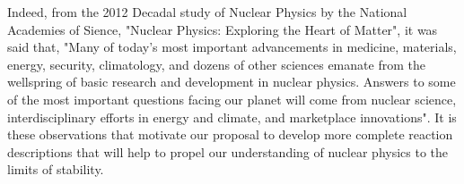 \documentclass[12pt]{article}
\begin{document}
   Indeed, from the 2012 Decadal study of Nuclear Physics by the National Academies of Sience, "Nuclear Physics: Exploring the
 Heart of Matter", it was said that, "Many of today’s most important advancements in medicine, materials, energy, security, climatology, and dozens of other sciences emanate from
 the wellspring of basic research and development in nuclear physics. Answers to some of the most important questions facing our planet will come from nuclear science,
 interdisciplinary efforts in energy and climate, and marketplace innovations". It is these observations that motivate our proposal to develop more complete reaction descriptions that will help to propel our understanding of nuclear physics to the limits of stability.  
\end{document}
